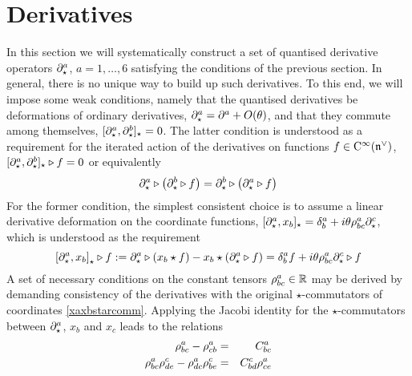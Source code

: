 \section{Derivatives}
\label{Derivatives}
In this section we will systematically construct a set of quantised derivative
operators $\partial^a_\star$, $a=1,\dots,6$ satisfying the conditions of the
previous section. In general, there is no unique way to build up such
derivatives. To this end, we will impose some weak conditions, namely that the
quantised derivatives be deformations of ordinary derivatives,
$\partial_\star^a=\partial^a+O(\theta)$, and that they commute among themselves,
$[\partial_\star^a,\partial_\star^b]_\star=0$. The latter condition is
understood as a requirement for the iterated action of the derivatives on
functions $f\in{\rm C}^\infty({\mathfrak n}^\vee)$,
$[\partial_\star^a,\partial_\star^b]_\star\triangleright f=0$ or equivalently
\begin{equation}
  \label{derivcommute}
  \partial_\star^a\triangleright\bigl(\partial_\star^b\triangleright f
  \bigr)=\partial_\star^b\triangleright\bigl(\partial_\star^a\triangleright
  f\bigr)
\end{equation}
For the former condition, the simplest consistent choice is to assume a linear
derivative deformation on the coordinate functions, $[\partial_\star^a,
x_b]_\star = \delta^a_{ b}+ i\theta \rho^a_{ bc} \partial^c_\star$, which is
understood as the requirement
\begin{equation}
  \label{dxreq}
  \left[\partial_\star^a , x_b\right]_\star\triangleright f:=
  \partial^a_\star\triangleright\left(x_b\star f\right)-
  x_b\star\left(\partial_\star^a\triangleright f\right)=
  \delta^a_{ b} f+ i\theta \rho^a_{ bc} \partial^c_\star
  \triangleright f
\end{equation}
A set of necessary conditions on the constant tensors $\rho^a_{ bc}\in{\mathbb R}$ may
be derived by demanding consistency of the derivatives with the original
$\star$-commutators of coordinates \eqref{xaxbstarcomm}. Applying the Jacobi
identity for the $\star$-commutators between $\partial^a_\star$, $x_b$ and $x_c$
leads to the relations
\begin{eqnarray}
  \label{rhoCrels}
  \rho^a_{ bc}-\rho^a_{ cb}&=&C_{bc}^{  a} \\\nonumber
  \rho^a_{ bc} \rho^c_{ de}-\rho^a_{ dc} \rho^c_{ be}&=&
  C_{bd}^{  c} \rho^a_{ ce}
\end{eqnarray}


